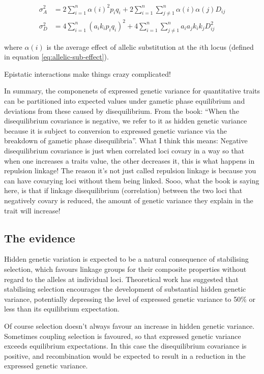 \documentclass[
]{book}
\begin{document}
\begin{align}
  \sigma^2_A &= 2\sum_{i=1}^{n} \alpha(i)^{2}p_{i}q_{i} + 2\sum_{i=1}^{n} \sum_{j\ne1}^{n} \alpha(i)\alpha(j)D_{ij} \label{eq:additve-var-LD} \\ 
  \sigma^2_D &= 4\sum_{i=1}^{n} (a_{i}k_{i}p_{i}q_{i})^{2} + 4\sum_{i=1}^{n} \sum_{j\ne1}^{n} a_{i}a_{j}k_{i}k_{j}D^2_{ij} \label{eq:dominance-var-LD}
\end{align}

where \(\alpha(i)\) is the average effect of allelic substitution at the \(i\)th locus (defined in equation \eqref{eq:allelic-sub-effect}).

Epistatic interactions make things crazy complicated!

In summary, the componenets of expressed genetic variance for quantitative traits can be partitioned into expected values under gametic phase equilibrium and deviations from these caused by disequilibrium. From the book: ``When the disequilibrium covariance is negative, we refer to it as hidden genetic variance because it is subject to conversion to expressed genetic variance via the breakdown of gametic phase disequilibria''. What I think this means: Negative disequilibrium covariance is just when correlated loci covary in a way so that when one increases a traits value, the other decreases it, this is what happens in repulsion linkage! The reason it's not just called repulsion linkage is because you can have covarying loci without them being linked. Sooo, what the book is saying here, is that if linkage disequilibrium (correlation) between the two loci that negatively covary is reduced, the amount of genetic variance they explain in the trait will increase!

\hypertarget{the-evidence}{%
\subsection{The evidence}\label{the-evidence}}

Hidden genetic variation is expected to be a natural consequence of stabilising selection, which favours linkage groups for their composite properties without regard to the alleles at individual loci. Theoretical work has suggested that stabilising selection encourages the development of substantial hidden genetic variance, potentially depressing the level of expressed genetic variance to 50\% or less than its equilibrium expectation.

Of course selection doesn't always favour an increase in hidden genetic variance. Sometimes coupling selection is favoured, so that expressed genetic variance exceeds equilibrium expectations. In this case the disequilibrium covariance is positive, and recombination would be expected to result in a reduction in the expressed genetic variance.
\end{document}
